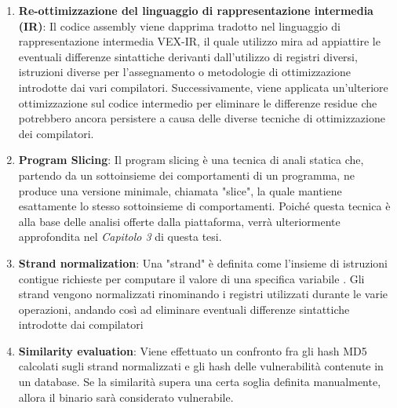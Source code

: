 \documentclass[../main.tex]{subfiles}
\begin{document}
\begin{enumerate}
    \item \textbf{Re-ottimizzazione del linguaggio di rappresentazione intermedia (IR)}: Il codice assembly viene dapprima tradotto nel linguaggio di rappresentazione intermedia VEX-IR, il quale utilizzo
    mira ad appiattire le eventuali differenze sintattiche derivanti dall'utilizzo di registri diversi, istruzioni diverse per l'assegnamento o metodologie di ottimizzazione introdotte dai vari compilatori.
    Successivamente, viene applicata un'ulteriore ottimizzazione sul codice intermedio per eliminare le differenze residue che potrebbero ancora persistere a causa delle diverse tecniche di ottimizzazione dei compilatori.
    \item \textbf{Program Slicing}: Il program slicing è una tecnica di anali statica che, partendo da un sottoinsieme dei comportamenti di un programma, ne produce una versione minimale, chiamata "slice",  la quale mantiene esattamente lo stesso sottoinsieme di comportamenti.
    Poiché questa tecnica è alla base delle analisi offerte dalla piattaforma, verrà ulteriormente approfondita nel \textit{Capitolo 3} di questa tesi.
    \item \textbf{Strand normalization}: Una "strand" è definita come l'insieme di istruzioni contigue richieste per computare il valore di una specifica variabile \cite{Statistical_similarities_in_binaries}.
    Gli strand vengono normalizzati rinominando i registri utilizzati durante le varie operazioni, andando così ad eliminare eventuali differenze sintattiche introdotte dai compilatori
    \item \textbf{Similarity evaluation}: Viene effettuato un confronto fra gli hash MD5 calcolati sugli strand normalizzati e gli hash delle vulnerabilità contenute in un database. Se la similarità supera una certa soglia definita manualmente, allora
    il binario sarà considerato vulnerabile.
\end{enumerate}
\end{document}
